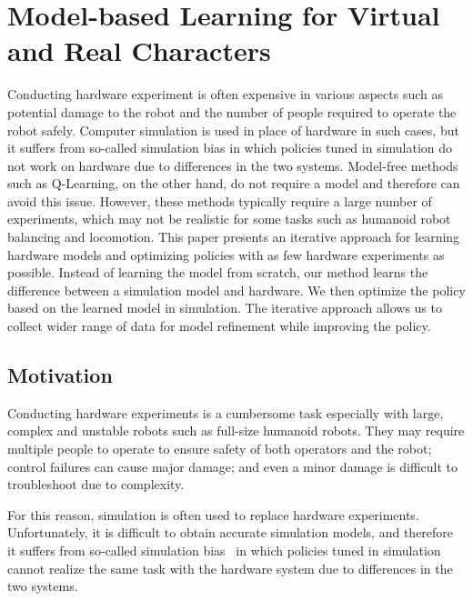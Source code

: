 \chapter{Model-based Learning for Virtual and Real Characters}

\graphicspath{{learning/}}

Conducting hardware experiment is often expensive in various aspects
 such as potential damage to the robot and the number of people required
 to operate the robot safely.
Computer simulation is used in place of hardware in such cases, but it
 suffers from so-called simulation bias in which policies tuned in
 simulation do not work on hardware due to differences in the two systems.
Model-free methods such as Q-Learning, on the other hand, do
 not require a model and therefore can avoid this issue.
However, these methods typically require a large number of experiments,
 which may not be realistic for some tasks such as humanoid
 robot balancing and locomotion.
This paper presents an iterative approach for learning hardware models
 and optimizing policies with as few hardware experiments as
 possible. 
Instead of learning the model from scratch, our method learns the
 difference between a simulation model and hardware.
We then optimize the policy based on the learned model in
 simulation. 
The iterative approach allows us to collect wider range of data for
 model refinement while improving the policy.

\newlength{\figw}
\newlength{\figh}

\section{Motivation}

Conducting hardware experiments is a cumbersome task especially with
large, complex and unstable robots such as full-size humanoid robots.
They may require multiple people to operate to ensure safety of both
operators and the robot; control failures can cause major damage; and even
a minor damage is difficult to troubleshoot due to complexity.

For this reason, simulation is often used to replace hardware
experiments. 
Unfortunately, it is difficult to obtain accurate simulation
models, and therefore it suffers from so-called simulation bias~\cite{bib-kober-survey} in which 
policies tuned in simulation cannot realize the same task with the
hardware system due to differences in the two systems.

